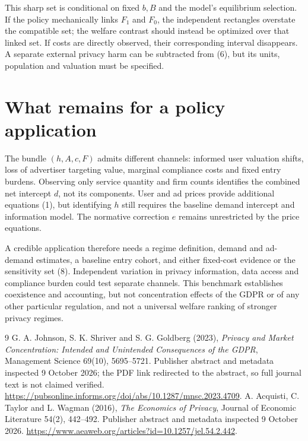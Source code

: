 \documentclass[11pt]{article}
\theoremstyle{remark}
\begin{document}
This sharp set is conditional on fixed $b,B$ and the model's equilibrium selection. If the policy mechanically links $F_1$ and $F_0$, the independent rectangles overstate the compatible set; the welfare contrast should instead be optimized over that linked set. If costs are directly observed, their corresponding interval disappears. A separate external privacy harm can be subtracted from (6), but its units, population and valuation must be specified.

\section{What remains for a policy application}
The bundle $(h,A,c,F)$ admits different channels: informed user valuation shifts, loss of advertiser targeting value, marginal compliance costs and fixed entry burdens. Observing only service quantity and firm counts identifies the combined net intercept $d$, not its components. User and ad prices provide additional equations (1), but identifying $h$ still requires the baseline demand intercept and information model. The normative correction $e$ remains unrestricted by the price equations.

A credible application therefore needs a regime definition, demand and ad-demand estimates, a baseline entry cohort, and either fixed-cost evidence or the sensitivity set (8). Independent variation in privacy information, data access and compliance burden could test separate channels. This benchmark establishes coexistence and accounting, but not concentration effects of the GDPR or of any other particular regulation, and not a universal welfare ranking of stronger privacy regimes.

\begin{thebibliography}{9}
 G. A. Johnson, S. K. Shriver and S. G. Goldberg (2023), \emph{Privacy and Market Concentration: Intended and Unintended Consequences of the GDPR}, Management Science 69(10), 5695--5721. Publisher abstract and metadata inspected 9 October 2026; the PDF link redirected to the abstract, so full journal text is not claimed verified. \url{https://pubsonline.informs.org/doi/abs/10.1287/mnsc.2023.4709}.
 A. Acquisti, C. Taylor and L. Wagman (2016), \emph{The Economics of Privacy}, Journal of Economic Literature 54(2), 442--492. Publisher abstract and metadata inspected 9 October 2026. \url{https://www.aeaweb.org/articles?id=10.1257/jel.54.2.442}.
\end{thebibliography}
\end{document}
